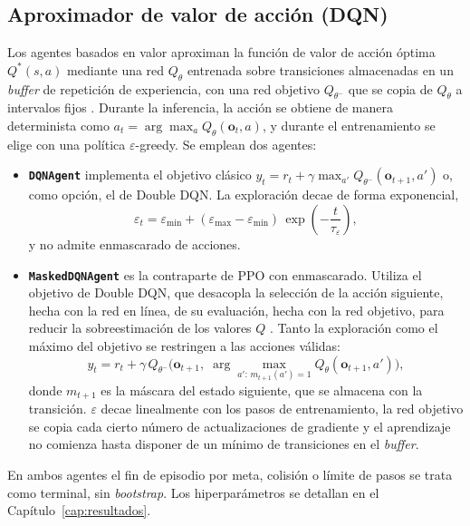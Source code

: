 \subsection{Aproximador de valor de acción (DQN)}\label{sec:dqn}
Los agentes basados en valor aproximan la función de valor de acción
óptima $Q^*(s,a)$ mediante una red $Q_\theta$ entrenada sobre
transiciones almacenadas en un \textit{buffer} de repetición de
experiencia, con una red objetivo $Q_{\theta^-}$ que se copia de
$Q_\theta$ a intervalos fijos \citep{mnih2015human}. Durante la
inferencia, la acción se obtiene de manera determinista como
$a_t = \arg\max_a Q_\theta(\mathbf{o}_t, a)$, y durante el entrenamiento
se elige con una política $\varepsilon$-greedy. Se emplean dos agentes:
\begin{itemize}
    \item \textbf{\texttt{DQNAgent}} implementa el objetivo clásico
    $y_t = r_t + \gamma \max_{a'} Q_{\theta^-}(\mathbf{o}_{t+1}, a')$
    \citep{mnih2015human} o, como opción, el de Double DQN. La
    exploración decae de forma exponencial,
    \begin{equation}
        \varepsilon_t = \varepsilon_{\min} + (\varepsilon_{\max} - \varepsilon_{\min})\,
        \exp\!\left(-\dfrac{t}{\tau_{\varepsilon}}\right),
    \end{equation}
    y no admite enmascarado de acciones.
    \item \textbf{\texttt{MaskedDQNAgent}} es la contraparte de PPO con
    enmascarado. Utiliza el objetivo de Double DQN, que desacopla la
    selección de la acción siguiente, hecha con la red en línea, de su
    evaluación, hecha con la red objetivo, para reducir la
    sobreestimación de los valores $Q$ \citep{vanhasselt2016deep}. Tanto
    la exploración como el máximo del objetivo se restringen a las
    acciones válidas:
    \begin{equation}\label{eq:ddqn_mask}
        y_t = r_t + \gamma\, Q_{\theta^-}\!\Big(\mathbf{o}_{t+1},\;
        \arg\max_{a' :\, m_{t+1}(a') = 1} Q_\theta(\mathbf{o}_{t+1}, a')\Big),
    \end{equation}
    donde $m_{t+1}$ es la máscara del estado siguiente, que se almacena
    con la transición. $\varepsilon$ decae linealmente con los pasos de
    entrenamiento, la red objetivo se copia cada cierto número de
    actualizaciones de gradiente y el aprendizaje no comienza hasta
    disponer de un mínimo de transiciones en el \textit{buffer}.
\end{itemize}
En ambos agentes el fin de episodio por meta, colisión o límite de pasos
se trata como terminal, sin \textit{bootstrap}. Los hiperparámetros se
detallan en el Capítulo~\ref{cap:resultados}.

